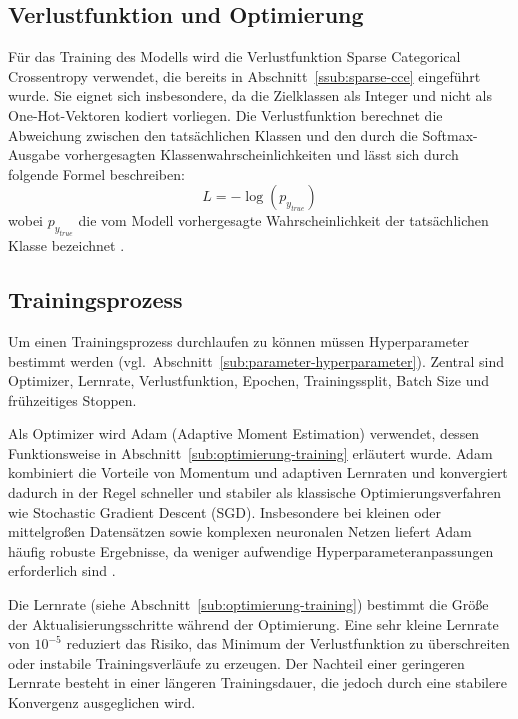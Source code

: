 \subsection{Verlustfunktion und Optimierung}\label{sub:verlustfunktion}

Für das Training des Modells wird die Verlustfunktion Sparse Categorical Crossentropy verwendet, die bereits in Abschnitt~\ref{ssub:sparse-cce} eingeführt wurde. Sie eignet sich insbesondere, da die Zielklassen als Integer und nicht als One-Hot-Vektoren kodiert vorliegen. Die Verlustfunktion berechnet die Abweichung zwischen den tatsächlichen Klassen und den durch die Softmax-Ausgabe vorhergesagten Klassenwahrscheinlichkeiten und lässt sich durch folgende Formel beschreiben:
$$L = -\log(p_{y_{true}})$$
wobei $p_{y_{true}}$ die vom Modell vorhergesagte Wahrscheinlichkeit der tatsächlichen Klasse bezeichnet \cite{WhatSparseCategorical10:49:00+00:00}.

\subsection{Trainingsprozess}\label{sub:trainingsprozess}

Um einen Trainingsprozess durchlaufen zu können müssen Hyperparameter bestimmt werden (vgl.\ Abschnitt~\ref{sub:parameter-hyperparameter}). Zentral sind Optimizer, Lernrate, Verlustfunktion, Epochen, Trainingssplit, Batch Size und frühzeitiges Stoppen.

Als Optimizer wird Adam (Adaptive Moment Estimation) verwendet, dessen Funktionsweise in Abschnitt~\ref{sub:optimierung-training} erläutert wurde. Adam kombiniert die Vorteile von Momentum und adaptiven Lernraten und konvergiert dadurch in der Regel schneller und stabiler als klassische Optimierungsverfahren wie Stochastic Gradient Descent (SGD). Insbesondere bei kleinen oder mittelgroßen Datensätzen sowie komplexen neuronalen Netzen liefert Adam häufig robuste Ergebnisse, da weniger aufwendige Hyperparameteranpassungen erforderlich sind \cite{a.g.TuningHyperparameterADAM2026}.

Die Lernrate (siehe Abschnitt~\ref{sub:optimierung-training}) bestimmt die Größe der Aktualisierungsschritte während der Optimierung. Eine sehr kleine Lernrate von $10^{-5}$ reduziert das Risiko, das Minimum der Verlustfunktion zu überschreiten oder instabile Trainingsverläufe zu erzeugen. Der Nachteil einer geringeren Lernrate besteht in einer längeren Trainingsdauer, die jedoch durch eine stabilere Konvergenz ausgeglichen wird.


